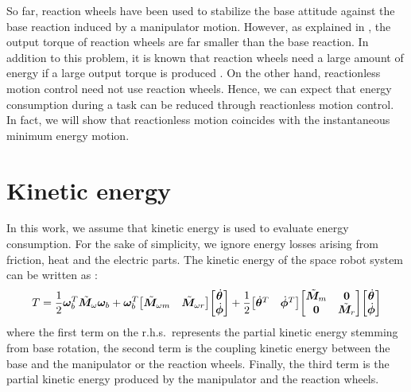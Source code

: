 %

So far, reaction wheels have been used to stabilize the base attitude against
the base reaction induced by a manipulator motion.
However, as explained in ,
the output torque of reaction wheels are far smaller than the base reaction.
In addition to this problem,
it is known that reaction wheels need a large amount of energy 
if a large output torque is produced \cite{Carpenter2009}.
On the other hand,
reactionless motion control need not use reaction wheels.
Hence, we can expect that energy consumption during a task can be reduced through reactionless motion control.
In fact,
we will show that reactionless motion coincides with the instantaneous minimum energy motion.

\section{Kinetic energy}
In this work, we assume that kinetic energy is used to evaluate energy consumption.
For the sake of simplicity,
we ignore energy losses arising from friction, heat and the electric parts.
The kinetic energy of the space robot system can be written as \cite{Masutani,Dimitrov2004}:
%
\begin{align}
  T = \frac{1}{2}\bm{\omega}_{b}^{T}{\tilde{\bm{M}}}_{\omega}\bm{\omega}_{b} +
  \bm{\omega}_{b}^{T}{\begin{bmatrix} {\tilde{\bm{M}}}_{\omega m} & {\tilde{\bm{M}}}_{\omega r} \end{bmatrix}}{\begin{bmatrix} {\dot{\bm{\theta}}} \\ {\dot{{\bm{\phi}}}} \end{bmatrix}}
  + \frac{1}{2}{\begin{bmatrix} {\dot{\bm{\theta}}}^{T} & {\dot{{\bm{\phi}}}}^{T} \end{bmatrix}}{\begin{bmatrix} {\tilde{\bm{M}}}_{m} & \bm{0} \\ \bm{0} & {\tilde{\bm{M}}}_{r} \end{bmatrix}}{\begin{bmatrix} {\dot{\bm{\theta}}} \\ {\dot{{\bm{\phi}}}} \end{bmatrix}}\label{eq:kin1}
\end{align}
%
where the first term on the r.h.s.\ represents the partial kinetic energy stemming from base rotation,
the second term is the coupling kinetic energy between the base and the manipulator or the reaction wheels.
Finally,
the third term is the partial kinetic energy produced by the manipulator and the reaction wheels.

